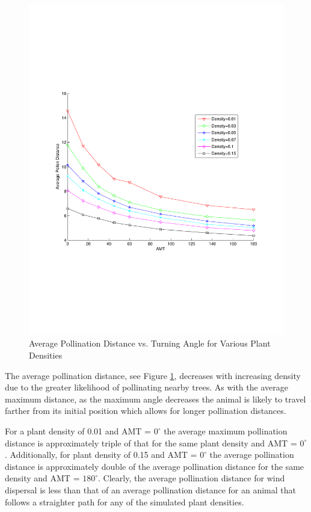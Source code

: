 \begin{figure}
  \begin{center}
  \includegraphics[width=1.0\textwidth]{PollenDVsAMT.pdf}
  \end{center}
  \caption{\small Average Pollination Distance vs. Turning Angle for Various Plant Densities}
  \label{AvgDist}
\end{figure}

The average pollination distance, see Figure \ref{AvgDist}, decreases with increasing density due to
the greater likelihood of pollinating nearby trees.  As with the average maximum distance, as the
maximum angle decreases the animal is likely to travel farther from its initial position which
allows for longer pollination distances.

For a plant density of 0.01 and AMT = $0^\circ$ the average maximum pollination distance is
approximately triple of that for the same plant density and AMT = $0^\circ$. Additionally, for plant
density of 0.15 and AMT = $0^\circ$ the average pollination distance is approximately double of the
average pollination distance for the same density and AMT = $180^\circ$. Clearly, the average
pollination distance for wind dispersal is less than that of an average pollination distance for an
animal that follows a straighter path for any of the simulated plant densities.

